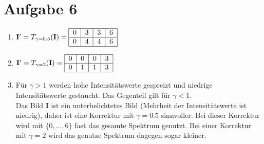 \documentclass[deutsch]{llncs}
\begin{document}
\section*{Aufgabe 6}
\begin{enumerate}
	\setlength\itemsep{1em}
	\item
	      \begin{math}
		      \mathbf{I}^\prime = T_{\gamma=0.5}(\mathbf{I}) =
		      \begin{tabular}{ |c|c|c|c| }
			      \hline
			      0 & 3 & 3 & 6 \\
			      \hline
			      0 & 4 & 4 & 6 \\
			      \hline
		      \end{tabular}
	      \end{math}

	\item
	      \begin{math}
		      \mathbf{I}^\prime = T_{\gamma=2}(\mathbf{I}) =
		      \begin{tabular}{ |c|c|c|c| }
			      \hline
			      0 & 0 & 0 & 3 \\
			      \hline
			      0 & 1 & 1 & 3 \\
			      \hline
		      \end{tabular}
	      \end{math}

	\item Für $\gamma > 1$ werden hohe Intensitätswerte gespreizt und niedrige Intensitätswerte gestaucht.
	      Das Gegenteil gilt für $\gamma < 1$.\\
	      Das Bild  $\mathbf{I}$ ist ein unterbelichtetes Bild (Mehrheit der Intensitätswerte ist niedrig),
	      daher ist eine Korrektur mit $\gamma = 0.5$ sinnvoller.
	      Bei dieser Korrektur wird mit $\{0, \ldots, 6  \}$ fast das gesamte Spektrum genutzt.
	      Bei einer Korrektur mit $\gamma = 2$ wird das genutze Spektrum dagegen sogar kleiner.
\end{enumerate}
\end{document}
